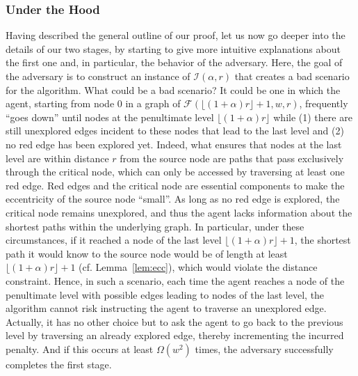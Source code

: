 \documentclass[11pt]{article}
\begin{document}
\subsubsection{Under the Hood}
Having described the general outline of our proof, let us now go deeper into the details of our two stages, by starting to give more intuitive explanations about the first one and, in particular, the behavior of the adversary. Here, the goal of the adversary is to construct an instance of $\mathcal{I}(\alpha, r)$ that creates a bad scenario for the algorithm. What could be a bad scenario?
It could be one in which the agent, starting from node $0$ in a graph
of $\mathcal{F}(\lfloor(1+\alpha)r\rfloor+1,w,r)$, frequently ``goes
down'' until nodes at the penultimate level
$\lfloor(1+\alpha)r\rfloor$ while (1) there are still unexplored
edges incident to these nodes that lead to the last level and (2) no
red edge has been explored yet.
Indeed, what ensures that nodes at the last level are within distance $r$ from the source node are paths that pass exclusively through the critical node, which can only be accessed by traversing at least one red edge. Red edges and the critical node are essential components to make the eccentricity of the source node ``small''. As long as no red edge is explored, the critical node remains unexplored, and thus the agent lacks information about the shortest paths within the underlying graph. In particular, under these circumstances, if it reached a node of the last level $\lfloor(1+\alpha)r\rfloor+1$, the shortest path it would know to the source node would be of length at least  $\lfloor(1+\alpha)r\rfloor+1$ (cf. Lemma~\ref{lem:ecc}), which would violate the distance constraint. Hence, in such a scenario, each time the agent reaches a node of the penultimate level with possible edges leading to nodes of the last level, the algorithm cannot risk instructing the agent to traverse an unexplored edge. Actually, it has no other choice but to ask the agent to go back to the previous level by traversing an already explored edge, thereby incrementing the incurred penalty. And if this occurs at least $\Omega(w^2)$ times, the adversary successfully completes the first stage.
\end{document}
